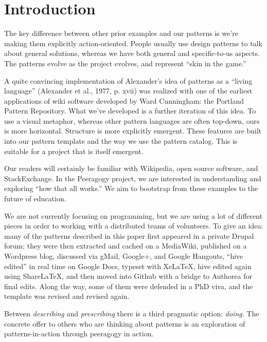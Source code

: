 \section{Introduction}

The key difference between other prior examples and our patterns is we're making them explicitly action-oriented.  People usually use design patterns to talk about general solutions, whereas we have both general and specific-to-us aspects. The patterns evolve as the project evolves, and represent ``skin in the game.''

A quite convincing implementation of Alexander’s idea of patterns as a “living language” (Alexander et
al., 1977, p. xvii) was realized with one of the earliest applications of wiki
software developed by Ward Cunningham: the Portland Pattern Repository.
What we've developed is a further iteration of this idea. To use a visual metaphor, whereas other pattern languages are often top-down, ours is more horizontal.  Structure is more explicitly emergent.  These features are built
into our pattern template and the way we use the pattern catalog.  This is suitable for a project
that is itself emergent.

Our readers will certainly be familiar with Wikipedia, open source
software, and StackExchange.  In the Peeragogy project, we are interested in
understanding and exploring ``how that all works.''  We aim to bootstrap from these examples to the future of education.

We are not currently focusing on programming, but we are using a lot of different pieces in order to working with a distributed teams of volunteers.  To give an idea: many of the patterns described in this paper first appeared in a private Drupal forum; they were then extracted and cached on a MediaWiki, published on a Wordpress blog, discussed via gMail, Google+, and Google Hangouts, ``hive edited'' in real time on Google Docs, typeset with XeLaTeX, hive edited again using ShareLaTeX, and then moved into Github with a bridge to Authorea for final edits.  Along the way, some of them were defended in a PhD viva, and the template was revised and revised again.

Between \emph{describing} and \emph{prescribing} there is a third pragmatic option: \emph{doing}.
The concrete offer to others who are thinking about patterns is an exploration of patterns-in-action
through peeragogy in action.